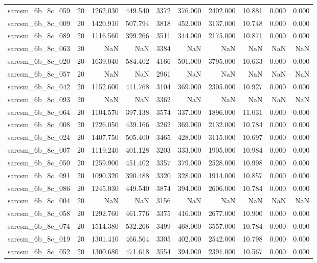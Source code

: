 \begin{tabular}{lrrrrrrrrr}
sarcsm\_6b\_8c\_059 & 20 & 1262.030 & 449.540 & 3372 & 376.000 & 2402.000 & 10.881 & 0.000 & 0.000 \\
sarcsm\_6b\_8c\_009 & 20 & 1420.910 & 507.794 & 3818 & 452.000 & 3137.000 & 10.748 & 0.000 & 0.000 \\
sarcsm\_6b\_8c\_089 & 20 & 1116.560 & 399.266 & 3511 & 344.000 & 2175.000 & 10.871 & 0.000 & 0.000 \\
sarcsm\_6b\_8c\_063 & 20 & NaN & NaN & 3384 & NaN & NaN & NaN & NaN & NaN \\
sarcsm\_6b\_8c\_020 & 20 & 1639.040 & 584.402 & 4166 & 501.000 & 3795.000 & 10.633 & 0.000 & 0.000 \\
sarcsm\_6b\_8c\_057 & 20 & NaN & NaN & 2961 & NaN & NaN & NaN & NaN & NaN \\
sarcsm\_6b\_8c\_042 & 20 & 1152.600 & 411.768 & 3104 & 369.000 & 2305.000 & 10.927 & 0.000 & 0.000 \\
sarcsm\_6b\_8c\_093 & 20 & NaN & NaN & 3362 & NaN & NaN & NaN & NaN & NaN \\
sarcsm\_6b\_8c\_064 & 20 & 1104.570 & 397.138 & 3574 & 337.000 & 1896.000 & 11.031 & 0.000 & 0.000 \\
sarcsm\_6b\_8c\_008 & 20 & 1226.050 & 439.166 & 3262 & 369.000 & 2132.000 & 10.784 & 0.000 & 0.000 \\
sarcsm\_6b\_8c\_024 & 20 & 1407.750 & 505.400 & 3465 & 428.000 & 3115.000 & 10.697 & 0.000 & 0.000 \\
sarcsm\_6b\_8c\_007 & 20 & 1119.240 & 401.128 & 3203 & 333.000 & 1905.000 & 10.984 & 0.000 & 0.000 \\
sarcsm\_6b\_8c\_050 & 20 & 1259.900 & 451.402 & 3357 & 379.000 & 2528.000 & 10.998 & 0.000 & 0.000 \\
sarcsm\_6b\_8c\_091 & 20 & 1090.320 & 390.488 & 3320 & 328.000 & 1914.000 & 10.857 & 0.000 & 0.000 \\
sarcsm\_6b\_8c\_086 & 20 & 1245.030 & 449.540 & 3874 & 394.000 & 2606.000 & 10.784 & 0.000 & 0.000 \\
sarcsm\_6b\_8c\_004 & 20 & NaN & NaN & 3156 & NaN & NaN & NaN & NaN & NaN \\
sarcsm\_6b\_8c\_058 & 20 & 1292.760 & 461.776 & 3375 & 416.000 & 2677.000 & 10.900 & 0.000 & 0.000 \\
sarcsm\_6b\_8c\_074 & 20 & 1514.380 & 532.266 & 3499 & 468.000 & 3557.000 & 10.784 & 0.000 & 0.000 \\
sarcsm\_6b\_8c\_019 & 20 & 1301.410 & 466.564 & 3305 & 402.000 & 2542.000 & 10.798 & 0.000 & 0.000 \\
sarcsm\_6b\_8c\_052 & 20 & 1300.680 & 471.618 & 3554 & 394.000 & 2391.000 & 10.567 & 0.000 & 0.000 \\

\end{tabular}
